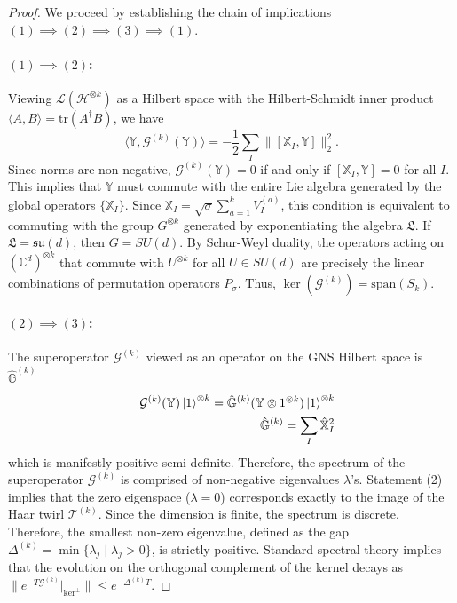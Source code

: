 \documentclass{article}
\theoremstyle{definition}
\newcommand{\Tr}{\text{tr}}
\newcommand{\nn}{\nonumber}
\begin{document}
    \begin{proof}
        We proceed by establishing the chain of implications $(1) \implies (2) \implies
        (3) \implies (1)$.

        \paragraph{$(1) \implies (2)$:}
        Viewing $\mathcal{L}(\mathcal{H}^{\otimes k})$ as a Hilbert space with
        the Hilbert-Schmidt inner product
        $\langle A, B \rangle = \Tr(A^{\dagger}B)$, we have
        \begin{equation}
            \langle \mathbb{Y}, \mathcal{G}^{(k)}(\mathbb{Y}) \rangle = -\frac{1}{2}
            \sum_{I}\| [\mathbb{X}_{I}, \mathbb{Y}] \|_{2}^{2}.
        \end{equation}
        Since norms are non-negative, $\mathcal{G}^{(k)}(\mathbb{Y}) = 0$ if and
        only if $[\mathbb{X}_{I}, \mathbb{Y}] = 0$ for all $I$. This implies that
        $\mathbb{Y}$ must commute with the entire Lie algebra generated by the global
        operators $\{\mathbb{X}_{I}\}$. Since
        $\mathbb{X}_{I}=\sqrt{\sigma}\sum_{a=1}^{k}V_{I}^{(a)}$, this condition is
        equivalent to commuting with the group $G^{\otimes k}$ generated by exponentiating
        the algebra $\mathfrak{L}$. If $\mathfrak{L}= \mathfrak{su}(d)$, then $G
        = SU(d)$. By Schur-Weyl duality, the operators acting on $(\mathbb{C}^{d}
        )^{\otimes k}$ that commute with $U^{\otimes k}$ for all $U \in SU(d)$ are
        precisely the linear combinations of permutation operators $P_{\sigma}$.
        Thus, $\ker(\mathcal{G}^{(k)}) = \text{span}(S_{k})$.

        \paragraph{$(2) \implies (3)$:}
        The superoperator $\mathcal{G}^{(k)}$ viewed as an operator on the GNS
        Hilbert space is $\hat{\mathbb{G}}^{(k)}$
        \begin{eqnarray}
            &&\mathcal{G}^{(k)}(\mathbb{Y})\ket{1}^{\otimes k}=\hat{\mathbb{G}}^{(k)}(\mathbb{Y}\otimes
            1^{\otimes k})\ket{1}^{\otimes k}\nn\\
            &&\hat{\mathbb{G}}^{(k)}=\sum_I \hat{\mathbb{X}}_I^2
        \end{eqnarray}
        which is manifestly positive semi-definite. Therefore, the spectrum of
        the superoperator $\mathcal{G}^{(k)}$ is comprised of non-negative
        eigenvalues $\lambda$'s. Statement (2) implies that the zero eigenspace ($\lambda
        =0$) corresponds exactly to the image of the Haar twirl $\mathcal{T}^{(k)}$.
        Since the dimension is finite, the spectrum is discrete. Therefore, the smallest
        non-zero eigenvalue, defined as the gap
        $\Delta^{(k)}= \min \{ \lambda_{j}\mid \lambda_{j}> 0 \}$, is strictly positive.
        Standard spectral theory implies that the evolution on the orthogonal
        complement of the kernel decays as
        $\| e^{-T\mathcal{G}^{(k)}}|_{\ker^\perp}\| \le e^{-\Delta^{(k)} T}$.


\end{proof}
\end{document}
